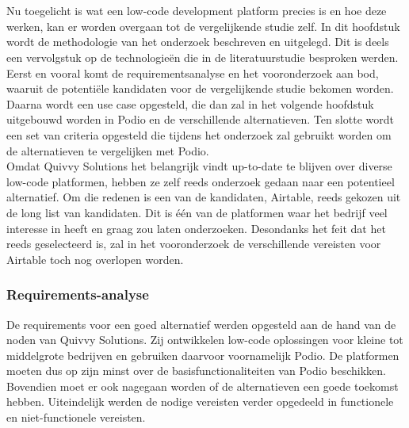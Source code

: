 
\chapter{}%
\label{ch:methodologie}



Nu toegelicht is wat een low-code development platform precies is en hoe deze werken, kan er worden overgaan tot de vergelijkende studie zelf. In dit hoofdstuk wordt de methodologie van het onderzoek beschreven en uitgelegd. Dit is deels een vervolgstuk op de technologieën die in de literatuurstudie besproken werden. Eerst en vooral komt de requirementsanalyse en het vooronderzoek aan bod, waaruit de potentiële kandidaten voor de vergelijkende studie bekomen worden. Daarna wordt een use case opgesteld, die dan zal in het volgende hoofdstuk uitgebouwd worden in Podio en de verschillende alternatieven. Ten slotte wordt een set van criteria opgesteld die tijdens het onderzoek zal gebruikt worden om de alternatieven te vergelijken met Podio. \\

Omdat Quivvy Solutions het belangrijk vindt up-to-date te blijven over diverse low-code platformen, hebben ze zelf reeds onderzoek gedaan naar een potentieel alternatief. Om die redenen is een van de kandidaten, Airtable, reeds gekozen uit de long list van kandidaten. Dit is één van de platformen waar het bedrijf veel interesse in heeft en graag zou laten onderzoeken. Desondanks het feit dat het reeds geselecteerd is, zal in het vooronderzoek de verschillende vereisten voor Airtable toch nog overlopen worden. \\


\subsection{Requirements-analyse}

De requirements voor een goed alternatief werden opgesteld aan de hand van de noden van Quivvy Solutions. Zij ontwikkelen low-code oplossingen voor kleine tot middelgrote bedrijven en gebruiken daarvoor voornamelijk Podio. De platformen moeten dus op zijn minst over de basisfunctionaliteiten van Podio beschikken. Bovendien moet er ook nagegaan worden of de alternatieven een goede toekomst hebben. Uiteindelijk werden de nodige vereisten verder opgedeeld in functionele en niet-functionele vereisten. \\

